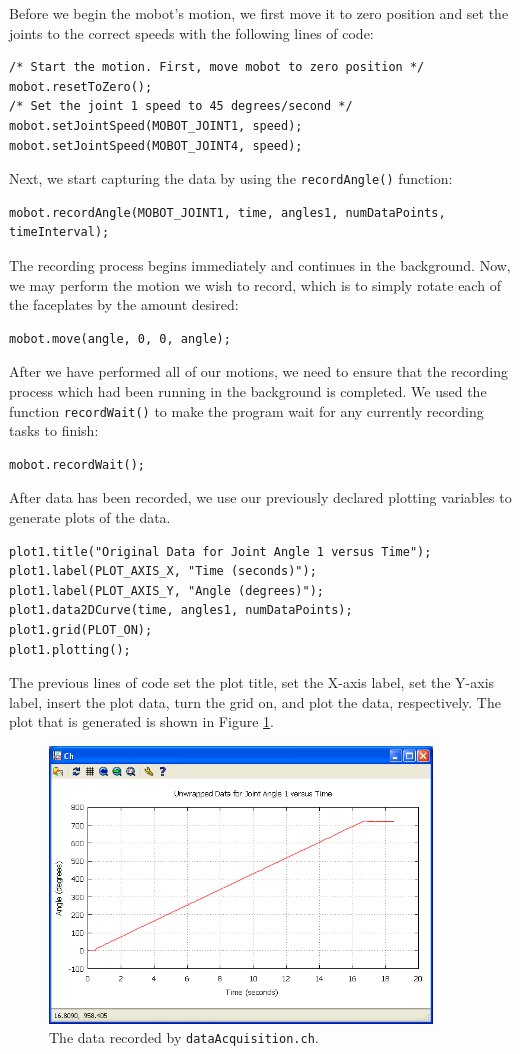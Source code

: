 \documentclass{article}
\begin{document}
Before we begin the mobot's motion, we first move it to zero position and set the
joints to the correct speeds with the following lines of code:
\begin{verbatim}
/* Start the motion. First, move mobot to zero position */
mobot.resetToZero();
/* Set the joint 1 speed to 45 degrees/second */
mobot.setJointSpeed(MOBOT_JOINT1, speed);
mobot.setJointSpeed(MOBOT_JOINT4, speed);
\end{verbatim}

Next, we start capturing the data by using the \texttt{recordAngle()} function:
\begin{verbatim}
mobot.recordAngle(MOBOT_JOINT1, time, angles1, numDataPoints, timeInterval);
\end{verbatim}

The recording process begins immediately and continues in the background. Now,
we may perform the motion we wish to record, which is to simply rotate each of
the faceplates by the amount desired:
\begin{verbatim}
mobot.move(angle, 0, 0, angle);
\end{verbatim}

After we have performed all of our motions, we need to ensure that the recording
process which had been running in the background is completed. We used the function
\texttt{recordWait()} to make the program wait for any currently recording tasks
to finish:
\begin{verbatim}
mobot.recordWait();
\end{verbatim}

After data has been recorded, we use our previously declared plotting variables to 
generate plots of the data. 
\begin{verbatim}
plot1.title("Original Data for Joint Angle 1 versus Time");
plot1.label(PLOT_AXIS_X, "Time (seconds)");
plot1.label(PLOT_AXIS_Y, "Angle (degrees)");
plot1.data2DCurve(time, angles1, numDataPoints);
plot1.grid(PLOT_ON);
plot1.plotting();
\end{verbatim}
The previous lines of code set the plot title, set the X-axis label, set the Y-axis label,
insert the plot data, turn the grid on, and plot the data, respectively. The plot
that is generated is shown in Figure \ref{fig:dataacq1_fig2}. 

\begin{figure}[H]
\centering
\includegraphics[width=4in]{images/dataacq1_plot2.png}
\caption{\label{fig:dataacq1_fig2} The data recorded by \texttt{dataAcquisition.ch}.}
\end{figure}
\end{document}

